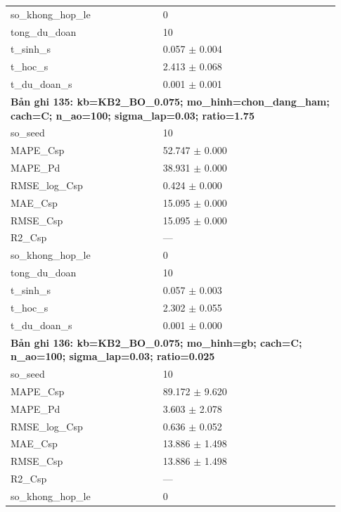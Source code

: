 \begin{longtable}{p{0.43\linewidth}p{0.50\linewidth}}
so\_\allowbreak khong\_\allowbreak hop\_\allowbreak le & 0 \\
tong\_\allowbreak du\_\allowbreak doan & 10 \\
t\_\allowbreak sinh\_\allowbreak s & 0.057 $\pm$ 0.004 \\
t\_\allowbreak hoc\_\allowbreak s & 2.413 $\pm$ 0.068 \\
t\_\allowbreak du\_\allowbreak doan\_\allowbreak s & 0.001 $\pm$ 0.001 \\
\midrule
\multicolumn{2}{p{0.95\linewidth}}{\textbf{Bản ghi 135: kb=KB2\_BO\_0.075; mo\_hinh=chon\_dang\_ham; cach=C; n\_ao=100; sigma\_lap=0.03; ratio=1.75}} \\
so\_\allowbreak seed & 10 \\
MAPE\_\allowbreak Csp & 52.747 $\pm$ 0.000 \\
MAPE\_\allowbreak Pd & 38.931 $\pm$ 0.000 \\
RMSE\_\allowbreak log\_\allowbreak Csp & 0.424 $\pm$ 0.000 \\
MAE\_\allowbreak Csp & 15.095 $\pm$ 0.000 \\
RMSE\_\allowbreak Csp & 15.095 $\pm$ 0.000 \\
R2\_\allowbreak Csp & — \\
so\_\allowbreak khong\_\allowbreak hop\_\allowbreak le & 0 \\
tong\_\allowbreak du\_\allowbreak doan & 10 \\
t\_\allowbreak sinh\_\allowbreak s & 0.057 $\pm$ 0.003 \\
t\_\allowbreak hoc\_\allowbreak s & 2.302 $\pm$ 0.055 \\
t\_\allowbreak du\_\allowbreak doan\_\allowbreak s & 0.001 $\pm$ 0.000 \\
\midrule
\multicolumn{2}{p{0.95\linewidth}}{\textbf{Bản ghi 136: kb=KB2\_BO\_0.075; mo\_hinh=gb; cach=C; n\_ao=100; sigma\_lap=0.03; ratio=0.025}} \\
so\_\allowbreak seed & 10 \\
MAPE\_\allowbreak Csp & 89.172 $\pm$ 9.620 \\
MAPE\_\allowbreak Pd & 3.603 $\pm$ 2.078 \\
RMSE\_\allowbreak log\_\allowbreak Csp & 0.636 $\pm$ 0.052 \\
MAE\_\allowbreak Csp & 13.886 $\pm$ 1.498 \\
RMSE\_\allowbreak Csp & 13.886 $\pm$ 1.498 \\
R2\_\allowbreak Csp & — \\
so\_\allowbreak khong\_\allowbreak hop\_\allowbreak le & 0 \\

\end{longtable}
